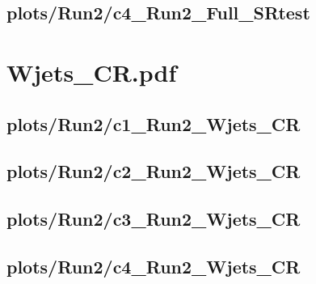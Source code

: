 \documentclass{article}
\begin{document}
      \subsection*{plots/Run2/c4\_Run2\_Full\_SRtest}
    \section*{Wjets_CR.pdf}
      \subsection*{plots/Run2/c1\_Run2\_Wjets\_CR}
      \subsection*{plots/Run2/c2\_Run2\_Wjets\_CR}
      \subsection*{plots/Run2/c3\_Run2\_Wjets\_CR}
      \subsection*{plots/Run2/c4\_Run2\_Wjets\_CR}
\end{document}
